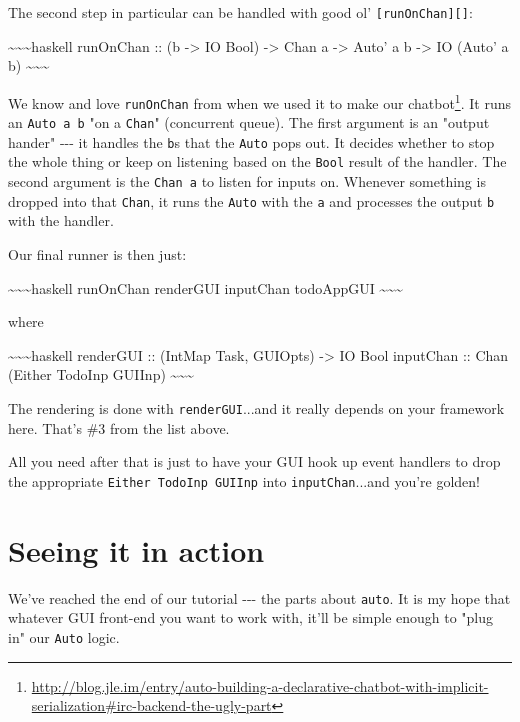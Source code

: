 \documentclass[]{article}
\renewcommand{\href}[2]{#2\footnote{\url{#1}}}
\begin{document}
The second step in particular can be handled with good ol'
\texttt{{[}runOnChan{]}{[}{]}}:

\textasciitilde{}\textasciitilde{}\textasciitilde{}haskell runOnChan :: (b
-\textgreater{} IO Bool) -\textgreater{} Chan a -\textgreater{} Auto' a b
-\textgreater{} IO (Auto' a b)
\textasciitilde{}\textasciitilde{}\textasciitilde{}

We know and love \texttt{runOnChan} from when we used it to make our
\href{http://blog.jle.im/entry/auto-building-a-declarative-chatbot-with-implicit-serialization\#irc-backend-the-ugly-part}{chatbot}.
It runs an \texttt{Auto\textquotesingle{}\ a\ b} "on a \texttt{Chan}"
(concurrent queue). The first argument is an "output hander" -\/-\/- it handles
the \texttt{b}s that the \texttt{Auto\textquotesingle{}} pops out. It decides
whether to stop the whole thing or keep on listening based on the \texttt{Bool}
result of the handler. The second argument is the \texttt{Chan\ a} to listen for
inputs on. Whenever something is dropped into that \texttt{Chan}, it runs the
\texttt{Auto\textquotesingle{}} with the \texttt{a} and processes the output
\texttt{b} with the handler.

Our final runner is then just:

\textasciitilde{}\textasciitilde{}\textasciitilde{}haskell runOnChan renderGUI
inputChan todoAppGUI \textasciitilde{}\textasciitilde{}\textasciitilde{}

where

\textasciitilde{}\textasciitilde{}\textasciitilde{}haskell renderGUI :: (IntMap
Task, GUIOpts) -\textgreater{} IO Bool inputChan :: Chan (Either TodoInp GUIInp)
\textasciitilde{}\textasciitilde{}\textasciitilde{}

The rendering is done with \texttt{renderGUI}...and it really depends on your
framework here. That's \#3 from the list above.

All you need after that is just to have your GUI hook up event handlers to drop
the appropriate \texttt{Either\ TodoInp\ GUIInp} into \texttt{inputChan}...and
you're golden!

\section{Seeing it in action}

We've reached the end of our tutorial -\/-\/- the parts about \texttt{auto}. It
is my hope that whatever GUI front-end you want to work with, it'll be simple
enough to "plug in" our \texttt{Auto} logic.
\end{document}
